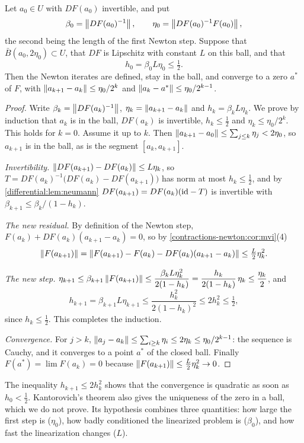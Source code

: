 \begin{notechapter}
\begin{theorem}[Kantorovich]\label{contractions-newton:thm:kantorovich}
Let $a_0\in U$ with $DF(a_0)$ invertible, and put
\[
  \beta_0 = \left\|DF(a_0)^{-1}\right\|, \qquad
  \eta_0 = \left\|DF(a_0)^{-1}F(a_0)\right\| ,
\]
the second being the length of the first Newton step. Suppose that
$\bar B(a_0, 2\eta_0)\subset U$, that $DF$ is Lipschitz with constant $L$
on this ball, and that
\[
  h_0 = \beta_0L\eta_0\leq\tfrac12 .
\]
Then the Newton iterates are defined, stay in the ball, and converge to a
zero $a^*$ of $F$, with
$\left\|a_{k+1} - a_k\right\|\leq\eta_0/2^k$ and
$\left\|a_k - a^*\right\|\leq\eta_0/2^{k-1}$.
\end{theorem}

\begin{proof}
Write $\beta_k = \left\|DF(a_k)^{-1}\right\|$,
$\eta_k = \left\|a_{k+1} - a_k\right\|$ and $h_k = \beta_kL\eta_k$. We prove by
induction that $a_k$ is in the ball, $DF(a_k)$ is invertible,
$h_k\leq\frac12$ and $\eta_k\leq\eta_0/2^k$. This holds for $k = 0$.
Assume it up to $k$. Then
$\left\|a_{k+1} - a_0\right\|\leq\sum_{j\leq k}\eta_j < 2\eta_0$, so $a_{k+1}$ is
in the ball, as is the segment $[a_k, a_{k+1}]$.

\emph{Invertibility.} $\left\|DF(a_{k+1}) - DF(a_k)\right\|\leq L\eta_k$, so
$T = DF(a_k)^{-1}\bigl(DF(a_k) - DF(a_{k+1})\bigr)$ has norm at most
$h_k\leq\frac12$, and by \cref{differential:lem:neumann}
$DF(a_{k+1}) = DF(a_k)(\mathrm{id} - T)$ is invertible with
$\beta_{k+1}\leq\beta_k/(1 - h_k)$.

\emph{The new residual.} By definition of the Newton step,
$F(a_k) + DF(a_k)(a_{k+1} - a_k) = 0$, so by
\cref{contractions-newton:cor:mvi}(4)
\[
  \left\|F(a_{k+1})\right\|
  = \left\|F(a_{k+1}) - F(a_k) - DF(a_k)(a_{k+1} - a_k)\right\|
  \leq\tfrac L2\eta_k^2 .
\]

\emph{The new step.}
$\eta_{k+1}\leq\beta_{k+1}\left\|F(a_{k+1})\right\|
\leq\dfrac{\beta_kL\eta_k^2}{2(1 - h_k)}
= \dfrac{h_k}{2(1 - h_k)}\,\eta_k\leq\dfrac{\eta_k}2$, and
\[
  h_{k+1} = \beta_{k+1}L\eta_{k+1}
  \leq\frac{h_k^2}{2(1 - h_k)^2}\leq2h_k^2\leq\tfrac12 ,
\]
since $h_k\leq\frac12$. This completes the induction.

\emph{Convergence.} For $j > k$,
$\left\|a_j - a_k\right\|\leq\sum_{i\geq k}\eta_i\leq2\eta_k\leq\eta_0/2^{k-1}$:
the sequence is Cauchy, and it converges to a point $a^*$ of the closed
ball. Finally $F(a^*) = \lim F(a_k) = 0$ because
$\left\|F(a_{k+1})\right\|\leq\frac L2\eta_k^2\to0$.
\end{proof}

The inequality $h_{k+1}\leq2h_k^2$ shows that the convergence is quadratic
as soon as $h_0 < \frac12$. Kantorovich's theorem also gives the
uniqueness of the zero in a ball, which we do not prove. Its hypothesis
combines three quantities: how large the first step is ($\eta_0$), how
badly conditioned the linearized problem is ($\beta_0$), and how fast the
linearization changes ($L$).


\end{notechapter}
